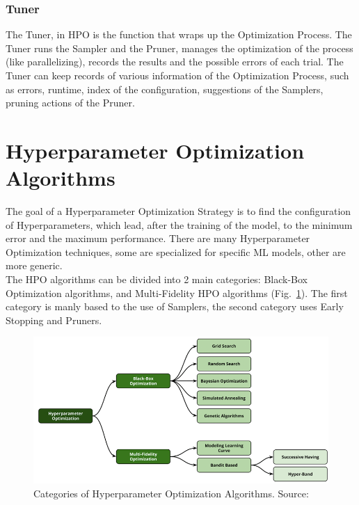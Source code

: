 \subsubsection{Tuner}

The Tuner, in HPO is the function that wraps up the Optimization Process. The Tuner runs the Sampler and the Pruner, manages the optimization of the process (like parallelizing), records the results and the possible errors of each trial.
The Tuner can keep records of various information of the Optimization Process, such as errors, runtime, index of the configuration, suggestions of the Samplers, pruning actions of the Pruner.

\section{Hyperparameter Optimization Algorithms}

The goal of a Hyperparameter Optimization Strategy is to find the configuration of Hyperparameters, which lead, after the training of the model, to the minimum error and the maximum performance.
There are many Hyperparameter Optimization techniques, some are specialized for specific ML models, other are more generic.
\\[0.3cm]The HPO algorithms can be divided into 2 main categories: Black-Box Optimization algorithms, and Multi-Fidelity HPO algorithms (Fig.~\ref{fig:figure-2.2.1}).
The first category is manly based to the use of Samplers, the second category uses Early Stopping and Pruners.
\begin{figure}[t]
	\centering
	\includegraphics[width=15cm]{figures/figure-2.2.1.png}
	\caption[Hyperparameter Optimization Algorithms]{Categories of Hyperparameter Optimization Algorithms. Source:~\cite{AutomatedML}}
	\label{fig:figure-2.2.1}
\end{figure}

